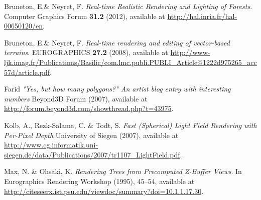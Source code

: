\documentclass{article}
\begin{document}
\newpage
\begin{thebibliography}{9}

  Bruneton, E.\& Neyret, F.
  \emph{Real-time Realistic Rendering and Lighting of Forests}.
  Computer Graphics Forum \textbf{31.2} (2012), available at
  \url{http://hal.inria.fr/hal-00650120/en}.

  Bruneton, E.\& Neyret, F.
  \emph{Real-time rendering and editing of vector-based terrains}.
  EUROGRAPHICS \textbf{27.2} (2008), available at
  \url{http://www-ljk.imag.fr/Publications/Basilic/com.lmc.publi.PUBLI_Article@1222d975265_acc57d/article.pdf}.

  Farid
  \emph{"Yes, but how many polygons?" An artist blog entry with interesting numbers}
  Beyond3D Forum (2007), available at
  \url{http://forum.beyond3d.com/showthread.php?t=43975}.

  Kolb, A., Rezk-Salama, C. \& Todt, S.
  \emph{Fast (Spherical) Light Field Rendering with Per-Pixel Depth}
  University of Siegen (2007), available at
  \url{http://www.cg.informatik.uni-siegen.de/data/Publications/2007/tr1107_LightField.pdf}.

  Max, N. \& Ohsaki, K.
  \emph{Rendering Trees from Precomputed Z-Buffer Views}.
  In Eurographics Rendering Workshop (1995), 45--54, available at
  \url{http://citeseerx.ist.psu.edu/viewdoc/summary?doi=10.1.1.17.30}.

\end{thebibliography}
\end{document}

